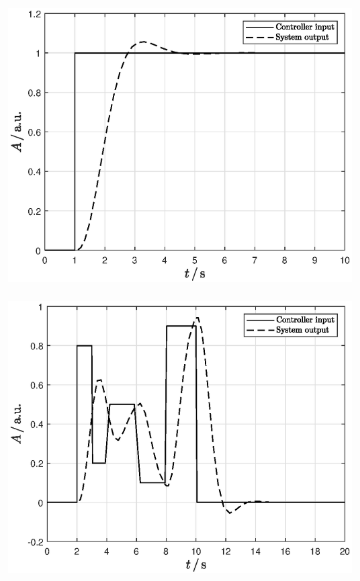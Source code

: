 \FloatBarrier
\begin{figure}[ht]
    \centering
    \begin{subfigure}[b]{0.45\textwidth}
    \includegraphics[width=\textwidth]{simulink/simulinkPlotStepController.eps}
    \caption{}
    \label{subfig:stepController}
    \end{subfigure}
    \begin{subfigure}[b]{0.45\textwidth}
    \includegraphics[width=\textwidth]{simulink/simulinkPlotTrajectoryController.eps}
    \caption{}
    \label{subfig:trajController}
    \end{subfigure}


\end{figure}
